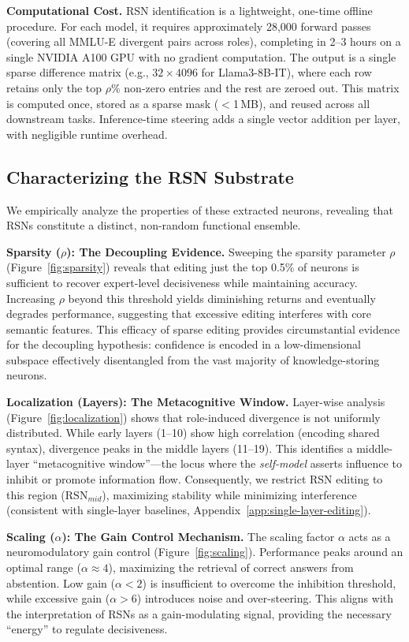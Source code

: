 \documentclass{article}
\begin{document}
\textbf{Computational Cost.}
RSN identification is a lightweight, one-time offline procedure. For each model, it requires approximately 28,000 forward passes (covering all MMLU-E divergent pairs across roles), completing in 2--3 hours on a single NVIDIA A100 GPU with no gradient computation. The output is a single sparse difference matrix (e.g., $32 \times 4096$ for Llama3-8B-IT), where each row retains only the top $\rho\%$ non-zero entries and the rest are zeroed out. This matrix is computed once, stored as a sparse mask ($<$1\,MB), and reused across all downstream tasks. Inference-time steering adds a single vector addition per layer, with negligible runtime overhead.

\subsection{Characterizing the RSN Substrate} 
We empirically analyze the properties of these extracted neurons, revealing that RSNs constitute a distinct, non-random functional ensemble.

\textbf{Sparsity ($\rho$): The Decoupling Evidence.}
Sweeping the sparsity parameter $\rho$ (Figure~\ref{fig:sparsity}) reveals that editing just the top 0.5\% of neurons is sufficient to recover expert-level decisiveness while maintaining accuracy. Increasing $\rho$ beyond this threshold yields diminishing returns and eventually degrades performance, suggesting that excessive editing interferes with core semantic features. This efficacy of sparse editing provides circumstantial evidence for the decoupling hypothesis: confidence is encoded in a low-dimensional subspace effectively disentangled from the vast majority of knowledge-storing neurons.

\textbf{Localization (Layers): The Metacognitive Window.}
Layer-wise analysis (Figure~\ref{fig:localization}) shows that role-induced divergence is not uniformly distributed. While early layers (1–10) show high correlation (encoding shared syntax), divergence peaks in the middle layers (11–19). This identifies a middle-layer ``metacognitive window''—the locus where the \emph{self-model} asserts influence to inhibit or promote information flow. Consequently, we restrict RSN editing to this region ($\text{RSN}_{mid}$), maximizing stability while minimizing interference (consistent with single-layer baselines, Appendix~\ref{app:single-layer-editing}).

\textbf{Scaling ($\alpha$): The Gain Control Mechanism.}
The scaling factor $\alpha$ acts as a neuromodulatory gain control (Figure~\ref{fig:scaling}). Performance peaks around an optimal range ($\alpha \approx 4$), maximizing the retrieval of correct answers from abstention. Low gain ($\alpha < 2$) is insufficient to overcome the inhibition threshold, while excessive gain ($\alpha > 6$) introduces noise and over-steering. This aligns with the interpretation of RSNs as a gain-modulating signal, providing the necessary ``energy'' to regulate decisiveness.
\end{document}
